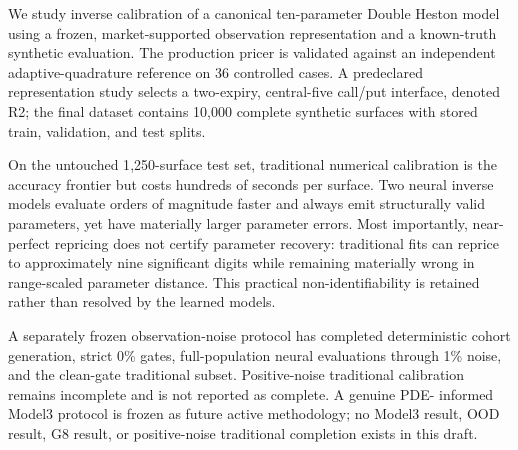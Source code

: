 We study inverse calibration of a canonical ten-parameter Double Heston model
using a frozen, market-supported observation representation and a known-truth
synthetic evaluation. The production pricer is validated against an independent
adaptive-quadrature reference on 36 controlled cases. A predeclared representation
study selects a two-expiry, central-five call/put interface, denoted R2; the final
dataset contains 10{,}000 complete synthetic surfaces with stored train,
validation, and test splits.

On the untouched 1{,}250-surface test set, traditional numerical calibration is
the accuracy frontier but costs hundreds of seconds per surface. Two neural
inverse models evaluate orders of magnitude faster and always emit structurally
valid parameters, yet have materially larger parameter errors. Most importantly,
near-perfect repricing does not certify parameter recovery: traditional fits can
reprice to approximately nine significant digits while remaining materially wrong
in range-scaled parameter distance. This practical non-identifiability is retained
rather than resolved by the learned models.

A separately frozen observation-noise protocol has completed deterministic cohort
generation, strict 0\% gates, full-population neural evaluations through 1\%
noise, and the clean-gate traditional subset. Positive-noise traditional
calibration remains incomplete and is not reported as complete. A genuine PDE-
informed Model3 protocol is frozen as future active methodology; no Model3 result,
OOD result, G8 result, or positive-noise traditional completion exists in this
draft.
